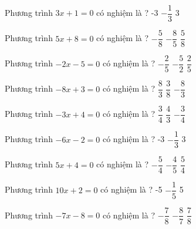 \begin{ex} 
 Phương trình $3x+1=0$ có nghiệm là ? 
 {-3} 
 {\True $- \dfrac{ 1 }{ 3 } $} 
 {3}  
 \loigiai{} 
 \end{ex} 
 
\begin{ex} 
 Phương trình $5x+8=0$ có nghiệm là ? 
 {$- \dfrac{ 5 }{ 8 } $} 
 {\True $- \dfrac{ 8 }{ 5 } $} 
 {$ \dfrac{ 5 }{ 8 } $}  
 \loigiai{} 
 \end{ex} 
 
\begin{ex} 
 Phương trình $-2x-5=0$ có nghiệm là ? 
 {$- \dfrac{ 2 }{ 5 } $} 
 {\True $- \dfrac{ 5 }{ 2 } $} 
 {$ \dfrac{ 2 }{ 5 } $}  
 \loigiai{} 
 \end{ex} 
 
\begin{ex} 
 Phương trình $-8x+3=0$ có nghiệm là ? 
 {$ \dfrac{ 8 }{ 3 } $} 
 {\True $ \dfrac{ 3 }{ 8 } $} 
 {$- \dfrac{ 8 }{ 3 } $}  
 \loigiai{} 
 \end{ex} 
 
\begin{ex} 
 Phương trình $-3x+4=0$ có nghiệm là ? 
 {$ \dfrac{ 3 }{ 4 } $} 
 {\True $ \dfrac{ 4 }{ 3 } $} 
 {$- \dfrac{ 3 }{ 4 } $}  
 \loigiai{} 
 \end{ex} 
 
\begin{ex} 
 Phương trình $-6x-2=0$ có nghiệm là ? 
 {-3} 
 {\True $- \dfrac{ 1 }{ 3 } $} 
 {3}  
 \loigiai{} 
 \end{ex} 
 
\begin{ex} 
 Phương trình $5x+4=0$ có nghiệm là ? 
 {$- \dfrac{ 5 }{ 4 } $} 
 {\True $- \dfrac{ 4 }{ 5 } $} 
 {$ \dfrac{ 5 }{ 4 } $}  
 \loigiai{} 
 \end{ex} 
 
\begin{ex} 
 Phương trình $10x+2=0$ có nghiệm là ? 
 {-5} 
 {\True $- \dfrac{ 1 }{ 5 } $} 
 {5}  
 \loigiai{} 
 \end{ex} 
 
\begin{ex} 
 Phương trình $-7x-8=0$ có nghiệm là ? 
 {$- \dfrac{ 7 }{ 8 } $} 
 {\True $- \dfrac{ 8 }{ 7 } $} 
 {$ \dfrac{ 7 }{ 8 } $}  
 \loigiai{} 
 \end{ex} 
 
